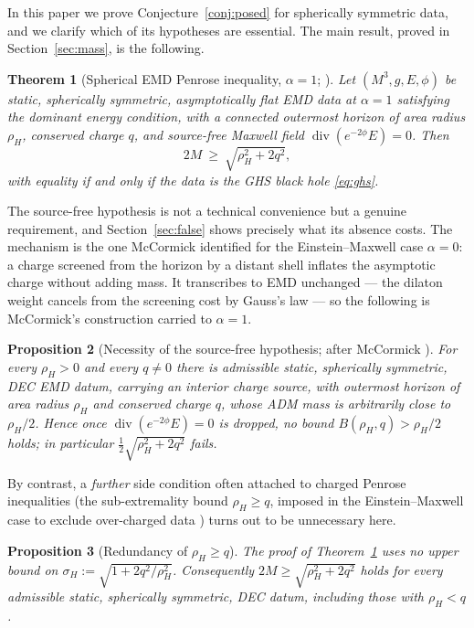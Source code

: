 \documentclass[11pt]{article}
\theoremstyle{plain}
\newtheorem{theorem}{Theorem}[section]
\newtheorem{proposition}[theorem]{Proposition}
\theoremstyle{definition}
\newcommand{\rH}{\rho_{\!H}}
\begin{document}
In this paper we prove Conjecture~\ref{conj:posed} for spherically symmetric data, and we clarify which of its
hypotheses are essential. The main result, proved in Section~\ref{sec:mass}, is the following.

\begin{theorem}[Spherical EMD Penrose inequality, $\alpha=1$; \cite{KWYext}]\label{thm:main}
Let $(M^3,g,E,\phi)$ be static, spherically symmetric, asymptotically flat EMD data at $\alpha=1$ satisfying
the dominant energy condition, with a connected outermost horizon of area radius $\rH$, conserved charge $q$,
and source-free Maxwell field $\operatorname{div}(e^{-2\phi}E)=0$. Then
\[
  2M\ \ge\ \sqrt{\rH^2+2q^2},
\]
with equality if and only if the data is the GHS black hole \eqref{eq:ghs}.
\end{theorem}

The source-free hypothesis is not a technical convenience but a genuine requirement, and Section~\ref{sec:false}
shows precisely what its absence costs. The mechanism is the one McCormick \cite{McCormick} identified for the
Einstein--Maxwell case $\alpha=0$: a charge screened from the horizon by a distant shell inflates the
asymptotic charge without adding mass. It transcribes to EMD unchanged --- the dilaton weight cancels from the
screening cost by Gauss's law --- so the following is McCormick's construction carried to $\alpha=1$.

\begin{proposition}[Necessity of the source-free hypothesis; after McCormick \cite{McCormick}]\label{prop:nogo}
For every $\rH>0$ and every $q\neq0$ there is admissible static, spherically symmetric, DEC EMD datum,
carrying an interior charge source, with outermost horizon of area radius $\rH$ and conserved charge $q$,
whose ADM mass is arbitrarily close to $\rH/2$. Hence once $\operatorname{div}(e^{-2\phi}E)=0$ is dropped, no
bound $B(\rH,q)>\rH/2$ holds; in particular $\tfrac12\sqrt{\rH^2+2q^2}$ fails.
\end{proposition}

By contrast, a \emph{further} side condition often attached to charged Penrose inequalities (the
sub-extremality bound $\rH\ge q$, imposed in the Einstein--Maxwell case to exclude over-charged data
\cite{DisconziKhuri,KWY,McCormick}) turns out to be unnecessary here.

\begin{proposition}[Redundancy of $\rH\ge q$]\label{prop:redundant}
The proof of Theorem~\ref{thm:main} uses no upper bound on $\sigma_H:=\sqrt{1+2q^2/\rH^2}$. Consequently
$2M\ge\sqrt{\rH^2+2q^2}$ holds for every admissible static, spherically symmetric, DEC datum, including those
with $\rH<q$.
\end{proposition}
\end{document}
